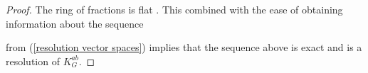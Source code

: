 \begin{proof}
  The ring of fractions is flat \cite[Chapter~3]{atiyah}. This combined with the ease of obtaining information about the sequence 
  \begin{center}
  \end{center}
  from (\ref{resolution vector spaces}) implies that the sequence above is exact and is a resolution of $K_G^{ab}$.



%
%
%
\end{proof}


